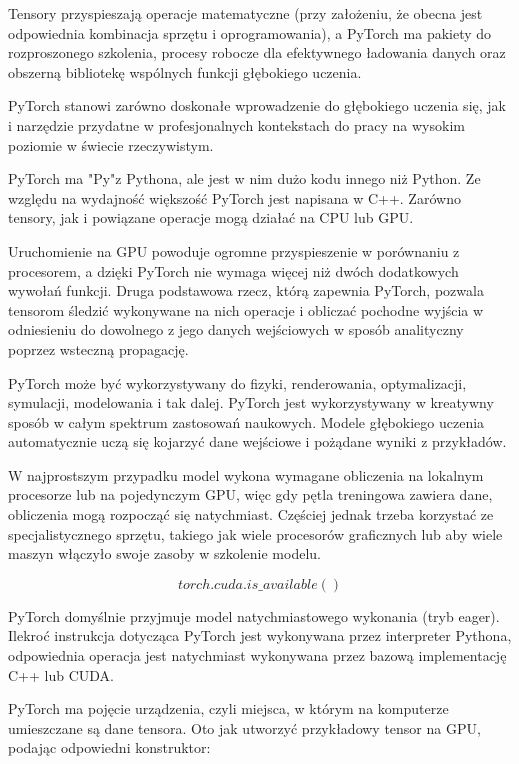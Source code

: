 \documentclass[brudnopis]{xmgr}
\begin{document}
 Tensory przyspieszają operacje matematyczne (przy założeniu, że obecna jest odpowiednia kombinacja sprzętu i oprogramowania), a PyTorch ma pakiety do rozproszonego szkolenia, procesy robocze dla efektywnego ładowania danych oraz obszerną bibliotekę wspólnych funkcji głębokiego uczenia.

PyTorch stanowi zarówno doskonałe wprowadzenie do głębokiego uczenia się, jak i narzędzie przydatne w profesjonalnych kontekstach do pracy na wysokim poziomie w świecie rzeczywistym.

PyTorch ma "Py"z Pythona, ale jest w nim dużo kodu innego niż Python. 
Ze względu na wydajność większość PyTorch jest napisana w C++. 
Zarówno tensory, jak i powiązane operacje mogą działać na CPU lub GPU. 

Uruchomienie na GPU powoduje ogromne przyspieszenie w porównaniu z procesorem, a dzięki PyTorch nie wymaga więcej niż dwóch dodatkowych wywołań funkcji. Druga podstawowa rzecz, którą zapewnia PyTorch, pozwala tensorom śledzić wykonywane na nich operacje i obliczać pochodne wyjścia w odniesieniu do dowolnego z jego danych wejściowych w sposób analityczny poprzez wsteczną propagację. 

PyTorch może być wykorzystywany do fizyki, renderowania, optymalizacji, symulacji, modelowania i tak dalej. PyTorch jest wykorzystywany w kreatywny sposób w całym spektrum zastosowań naukowych. Modele głębokiego uczenia automatycznie uczą się kojarzyć dane wejściowe i pożądane wyniki z przykładów.

W najprostszym przypadku model wykona wymagane obliczenia na lokalnym procesorze lub na pojedynczym GPU, więc gdy pętla treningowa zawiera dane, obliczenia mogą rozpocząć się natychmiast. Częściej jednak trzeba korzystać ze specjalistycznego sprzętu, takiego jak wiele procesorów graficznych lub aby wiele maszyn włączyło swoje zasoby w szkolenie modelu. 

\begin{equation}
torch.cuda.is\_available()
\end{equation}



PyTorch domyślnie przyjmuje model natychmiastowego wykonania (tryb eager).
Ilekroć instrukcja dotycząca PyTorch jest wykonywana przez interpreter Pythona, odpowiednia operacja jest natychmiast wykonywana przez bazową implementację C++ lub CUDA. 


PyTorch ma pojęcie urządzenia, czyli miejsca, w którym na komputerze umieszczane są dane tensora. Oto jak utworzyć przykładowy tensor na GPU, podając odpowiedni konstruktor:
\end{document}
